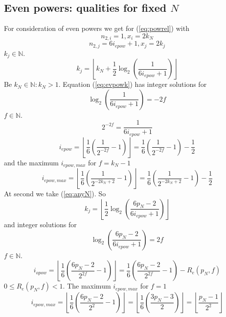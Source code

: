 \documentclass{aomart}
\theoremstyle{definition}
\begin{document}
\subsection{Even powers: qualities for fixed $N$}
\label{ss:evenqual}
For consideration of even powers we get for (\ref{eq:powrel}) with
\[ n_{2,i} = 1, x_{i} = 2k_{N} \]
\[ n_{2,j} = 6i_{epow} + 1, x_{j} = 2k_{j} \]
$k_{j} \in \mathbb{N}$.
\begin{equation}\label{eq:evpowk}
	k_{j} = \left\lfloor k_{N} + \frac{1}{2} \log_{2} \left( \frac{1}{6i_{epow}+1} \right) \right\rfloor
\end{equation}
Be $k_{N} \in \mathbb{N}: k_{N} > 1$. Equation (\ref{eq:evpowk}) has integer solutions for
\[ \log_{2}\left( \frac{1}{6i_{epow}+1} \right) = -2f \]
$f \in \mathbb{N}$.
\[ 2^{-2f} = \frac{1}{6i_{epow}+1} \]
\begin{equation}\label{eq:evpowi}
	i_{epow} = \left\lfloor \frac{1}{6} \left( \frac{1}{2^{-2f}} - 1 \right) \right\rfloor = \frac{1}{6} \left( \frac{1}{2^{-2f}} - 1 \right) - \frac{1}{2}
\end{equation}
and the maximum $i_{epow,max}$ for $f=k_{N}-1$
\begin{equation}\label{eq:evpowimax}
	i_{epow,max} = \left\lfloor \frac{1}{6} \left( \frac{1}{2^{-2k_{N}+2}} - 1 \right) \right\rfloor = \frac{1}{6} \left( \frac{1}{2^{-2k_{N}+2}} - 1 \right) - \frac{1}{2}
\end{equation}
At second we take (\ref{eq:anyN}). So
\begin{equation}\label{eq:evpowanyk}
	k_{j} = \left\lfloor \frac{1}{2} \log_{2} \left( \frac{6p_{N}-2}{6i_{epow}+1} \right) \right\rfloor
\end{equation}
and integer solutions for
\[ \log_{2} \left( \frac{6p_{N}-2}{6i_{epow}+1} \right) = 2f \]
$f \in \mathbb{N}$.
\begin{equation}\label{eq:epowanyki}
	i_{opow} = \left\lfloor \frac{1}{6} \left( \frac{6p_{N}-2}{2^{2f}} - 1 \right) \right\rfloor = \frac{1}{6} \left( \frac{6p_{N}-2}{2^{2f}} - 1 \right) - R_{e}(p_{N},f)
\end{equation}
$0 \leq R_{e}(p_{N},f) < 1$. The maximum $i_{epow, max}$ for $f = 1$
\begin{equation}\label{eq:epowanykimax}
	i_{epow,max} = \left\lfloor \frac{1}{6} \left( \frac{6p_{N}-2}{2^{2}} - 1 \right) \right\rfloor = \left\lfloor \frac{1}{6} \left( \frac{3p_{N}-3}{2} \right) \right\rfloor = \left\lfloor \frac{p_{N}-1}{2^{2}} \right\rfloor
\end{equation}
\end{document}
